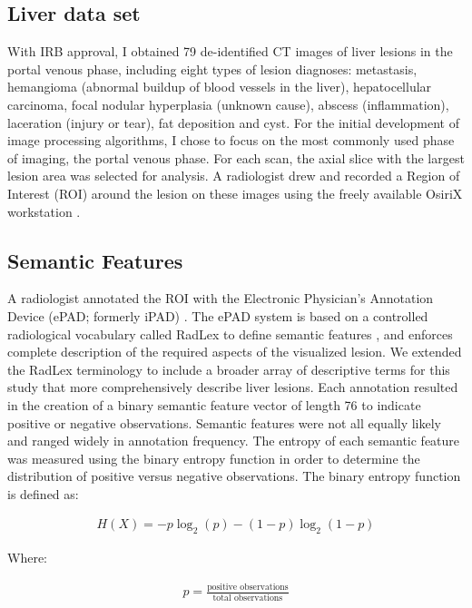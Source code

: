 \subsection{Liver data set}
With IRB approval, I obtained 79 de-identified CT images of liver lesions in the portal venous phase, including eight types of lesion diagnoses: metastasis, hemangioma (abnormal buildup of blood vessels in the liver), hepatocellular carcinoma, focal nodular hyperplasia (unknown cause), abscess (inflammation), laceration (injury or tear), fat deposition and cyst.
For the initial development of image processing algorithms, I chose to focus on the most commonly used phase of imaging, the portal venous phase.
For each scan, the axial slice with the largest lesion area was selected for analysis.
A radiologist drew and recorded a Region of Interest (ROI) around the lesion on these images using the freely available OsiriX workstation \cite{Armato:2007ks,Rosset:2004kk}.


\subsection{Semantic Features}
A radiologist annotated the ROI with the Electronic Physician's Annotation Device (ePAD; formerly iPAD) \cite{Napel:2010vb, Rubin:2008uz}.
The ePAD system is based on a controlled radiological vocabulary called RadLex to define semantic features \cite{Korenblum:2011gx, Langlotz:2006jn}, and enforces complete description of the required aspects of the visualized lesion.
We extended the RadLex terminology to include a broader array of descriptive terms for this study that more comprehensively describe liver lesions.
Each annotation resulted in the creation of a binary semantic feature vector of length 76 to indicate positive or negative observations.
Semantic features were not all equally likely and ranged widely in annotation frequency.
The entropy of each semantic feature was measured using the binary entropy function in order to determine the distribution of positive versus negative observations.
The binary entropy function is defined as:

\begin{align}
H(X) = -p\log_2(p) - (1-p)\log_2(1-p)
\end{align}

Where:

\begin{align}
p = \frac{\textrm{positive observations}}{\textrm{total observations}}
\end{align}

